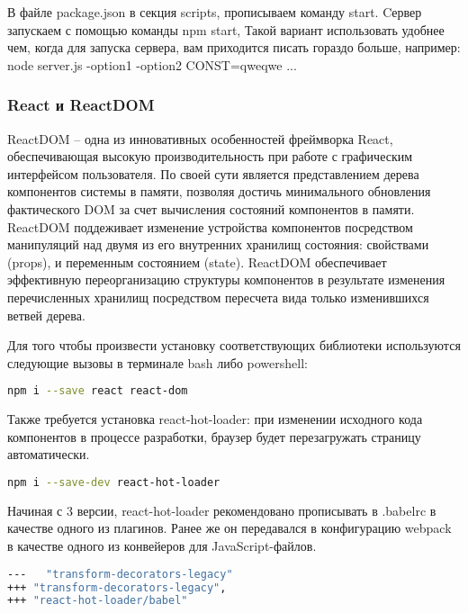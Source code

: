 В файле package.json в секция scripts, прописываем команду start. 
Cервер запускаем с помощью команды npm start, 
Такой вариант использовать удобнее чем, когда для запуска сервера, вам приходится писать гораздо больше, например:
node server.js -option1 -option2 CONST=qweqwe ... 

\subsubsection{React и ReactDOM}

ReactDOM -- одна из инновативных особенностей фреймворка React, обеспечивающая высокую производительность при работе с графическим интерфейсом пользователя.
По своей сути является представлением дерева компонентов системы в памяти, позволяя достичь минимального обновления фактического DOM за счет вычисления состояний компонентов в памяти.
ReactDOM поддеживает изменение устройства компонентов посредством манипуляций над двумя из его внутренних хранилищ состояния: свойствами (props), и переменным состоянием (state). ReactDOM
обеспечивает эффективную переорганизацию структуры компонентов в результате изменения перечисленных хранилищ посредством пересчета вида только изменившихся ветвей дерева.

Для того чтобы произвести установку соответствующих библиотеки используются следующие вызовы в терминале bash либо powershell:

\begin{lstlisting}[language=bash, label=lst:domain:typescript]
npm i --save react react-dom
\end{lstlisting}

Также требуется установка react-hot-loader: при изменении исходного кода компонентов в процессе разработки, браузер будет перезагружать страницу автоматически. 

\begin{lstlisting}[language=bash, label=lst:domain:typescript]
npm i --save-dev react-hot-loader
\end{lstlisting}

Начиная с 3 версии, react-hot-loader рекомендовано прописывать в .babelrc в качестве одного из плагинов. Ранее же он передавался в конфигурацию webpack 
в качестве одного из конвейеров для JavaScript-файлов.

\begin{lstlisting}[language=bash, label=lst:domain:typescript]
---   "transform-decorators-legacy"
+++ "transform-decorators-legacy",
+++ "react-hot-loader/babel"
\end{lstlisting}